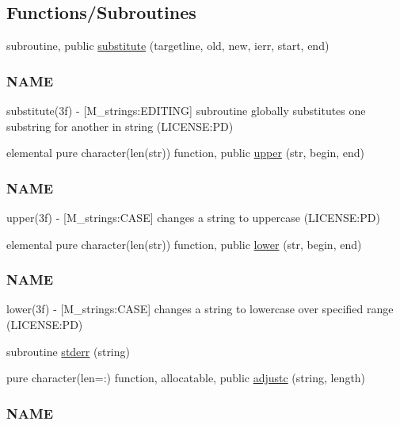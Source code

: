 \subsection*{Functions/\+Subroutines}
\begin{DoxyCompactItemize}
\item 
subroutine, public \mbox{\hyperlink{namespacem__time__duplicate_abc203f3a6afc1edeecbcdc58b187a5d5}{substitute}} (targetline, old, new, ierr, start, end)
\begin{DoxyCompactList}\small\item\em \subsubsection*{N\+A\+ME}

substitute(3f) -\/ \mbox{[}M\+\_\+strings\+:E\+D\+I\+T\+I\+NG\mbox{]} subroutine globally substitutes one substring for another in string (L\+I\+C\+E\+N\+SE\+:PD) \end{DoxyCompactList}\item 
elemental pure character(len(str)) function, public \mbox{\hyperlink{namespacem__time__duplicate_aabdd1a3e01b26e896bd06aee488de7c6}{upper}} (str, begin, end)
\begin{DoxyCompactList}\small\item\em \subsubsection*{N\+A\+ME}

upper(3f) -\/ \mbox{[}M\+\_\+strings\+:C\+A\+SE\mbox{]} changes a string to uppercase (L\+I\+C\+E\+N\+SE\+:PD) \end{DoxyCompactList}\item 
elemental pure character(len(str)) function, public \mbox{\hyperlink{namespacem__time__duplicate_af8b4555e0c47e2ec327f0434d84b9c56}{lower}} (str, begin, end)
\begin{DoxyCompactList}\small\item\em \subsubsection*{N\+A\+ME}

lower(3f) -\/ \mbox{[}M\+\_\+strings\+:C\+A\+SE\mbox{]} changes a string to lowercase over specified range (L\+I\+C\+E\+N\+SE\+:PD) \end{DoxyCompactList}\item 
subroutine \mbox{\hyperlink{namespacem__time__duplicate_aaf5c25d7bce4f2776df6c1e586b2e277}{stderr}} (string)
\item 
pure character(len=\+:) function, allocatable, public \mbox{\hyperlink{namespacem__time__duplicate_a487dbbb116d2c7022b39869d4990cf6f}{adjustc}} (string, length)
\begin{DoxyCompactList}\small\item\em \subsubsection*{N\+A\+ME}


\end{DoxyCompactList}
\end{DoxyCompactItemize}
